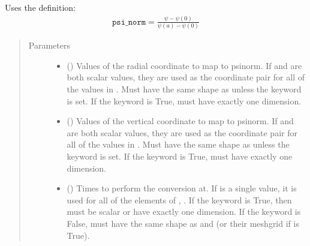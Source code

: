 \documentclass[letterpaper,10pt,english]{sphinxmanual}
\begin{document}
\begin{fulllineitems}
\begin{fulllineitems}
Uses the definition:
\begin{equation*}
\begin{split}\texttt{psi\_norm} = \frac{\psi - \psi(0)}{\psi(a) - \psi(0)}\end{split}
\end{equation*}\begin{quote}\begin{description}
\item[{Parameters}] \leavevmode\begin{itemize}
\item {} 
 () \textendash{} Values of the radial coordinate to
map to psinorm. If  and  are both scalar values,
they are used as the coordinate pair for all of the values in
. Must have the same shape as  unless the 
keyword is set. If the  keyword is True,  must
have exactly one dimension.

\item {} 
 () \textendash{} Values of the vertical coordinate to
map to psinorm. If  and  are both scalar values,
they are used as the coordinate pair for all of the values in
. Must have the same shape as  unless the 
keyword is set. If the  keyword is True,  must
have exactly one dimension.

\item {} 
 () \textendash{} Times to perform the conversion at.
If  is a single value, it is used for all of the elements of
, . If the  keyword is True, then  must be
scalar or have exactly one dimension. If the  keyword is
False,  must have the same shape as  and  (or their
meshgrid if  is True).


\end{itemize}
\end{description}
\end{quote}
\end{fulllineitems}
\end{fulllineitems}
\end{document}
